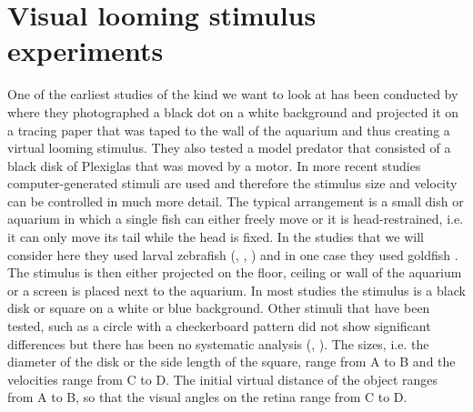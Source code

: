 \documentclass[a4paper,10pt,hidelinks]{scrreprt}
\begin{document}
	\section{Visual looming stimulus experiments}
	One of the earliest studies of the kind we want to look at has been conducted by 
	\cite{Dill1974} where they photographed a black dot on a white background and projected it on 
	a tracing paper that was taped to the wall of the aquarium and thus creating a virtual looming 
	stimulus.
	They also tested a model predator that consisted of a black disk of Plexiglas that was moved by 
	a motor.
	In more recent studies computer-generated stimuli are used and therefore the stimulus size 
	and velocity can be controlled in much more detail.
	The typical arrangement is a small dish or aquarium in which a single fish can either freely 
	move or it is head-restrained, i.e. it can only move its tail while the head is fixed. 
	In the studies that we will consider here they used larval zebrafish (\cite{Temizer2015}, 
	\cite{Dunn2016}, \cite{Bhattacharyya2017}) and in one case they used goldfish 
	\citep{Preuss2006}.
	The stimulus is then either projected on the floor, ceiling or wall of the aquarium or a screen 
	is placed next to the aquarium.
	In most studies the stimulus is a black disk or square on a white or blue background.
	Other stimuli that have been tested, such as a circle with a checkerboard pattern did not show 
	significant differences but there has been no systematic analysis (\cite{Preuss2006}, 
	\cite{Dunn2016}).
	The sizes, i.e. the diameter of the disk or the side length of the square, range from A to B 
	and the velocities range from C to D. %
	The initial virtual distance of the object ranges from A to B, so that the visual angles on the 
	retina range from C to D. %
	
\end{document}
